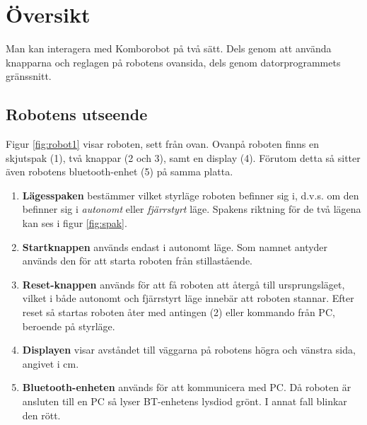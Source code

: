 
%
%


\section{Översikt}

Man kan interagera med Komborobot på två sätt. Dels genom att använda knapparna och reglagen på robotens ovansida, dels genom datorprogrammets gränssnitt. 

\subsection{Robotens utseende}

Figur \ref{fig:robot1} visar roboten, sett från ovan. Ovanpå roboten finns en skjutspak (1), två knappar (2 och 3),  samt en display (4).   Förutom detta så sitter även robotens bluetooth-enhet (5) på samma platta. 


\begin{enumerate}
\item{\bf Lägesspaken} bestämmer vilket styrläge roboten befinner sig i, d.v.s. om den befinner sig i \emph{autonomt} eller \emph{fjärrstyrt} läge. Spakens riktning för de två lägena kan ses i figur \ref{fig:spak}.
\item {\bf Startknappen} används endast i autonomt läge. Som namnet antyder används den för att starta roboten från stillastående. 
\item{\bf Reset-knappen} används för att få roboten att återgå till ursprungsläget, vilket i både autonomt och fjärrstyrt läge innebär att roboten stannar. Efter reset så startas roboten åter med antingen (2) eller kommando från PC, beroende på styrläge.
\item{\bf Displayen} visar avståndet till väggarna på robotens högra och vänstra sida, angivet i cm. 
\item{\bf Bluetooth-enheten} används för att kommunicera med PC. Då roboten är ansluten till en PC så lyser BT-enhetens lysdiod grönt. I annat fall blinkar den rött. 
\end{enumerate}

